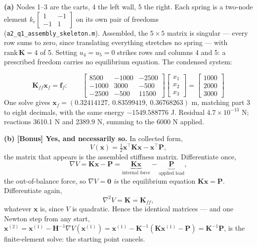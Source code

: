 \documentclass[11pt,a4paper]{article}
\begin{document}
\begin{sloppypar}
\textbf{(a)} Nodes 1--3 are the carts, 4 the left wall, 5 the right. Each spring
is a two-node element
$k_e \left[\begin{smallmatrix} 1 & -1 \\ -1 & 1\end{smallmatrix}\right]$ on its
own pair of freedoms (\texttt{a2\_q1\_assembly\_skeleton.m}). Assembled, the
$5 \times 5$ matrix is singular --- every row sums to zero, since translating
everything stretches no spring --- with $\mathrm{rank}\,\bm{K} = 4$ of 5.
Setting $u_4 = u_5 = 0$ strikes rows and columns 4 and 5: a prescribed freedom
carries no equilibrium equation. The condensed system:
\end{sloppypar}
\[
  \bm{K}_{ff}\bm{x}_f = \bm{f}_f :
  \qquad
  \begin{bmatrix} 8500 & -1000 & -2500 \\ -1000 & 3000 & -500 \\
                  -2500 & -500 & 11500 \end{bmatrix}
  \begin{bmatrix} x_1 \\ x_2 \\ x_3 \end{bmatrix}
  =
  \begin{bmatrix} 1000 \\ 2000 \\ 3000 \end{bmatrix}
\]
One solve gives $\bm{x}_f = (0.32414127,\ 0.83599419,\ 0.36768263)$ m, matching
part 3 to eight decimals, with the same energy $-1549.588776$ J. Residual
$4.7\times10^{-13}$ N; reactions 3610.1 N and 2389.9 N, summing to the 6000 N
applied.

\textbf{(b) [Bonus] Yes, and necessarily so.} In collected form,
\[
  V(\bm{x}) = \tfrac12 \bm{x}^\top\bm{K}\bm{x} - \bm{x}^\top\bm{P},
\]
the matrix that appears is the assembled stiffness matrix. Differentiate once,
\[
  \nabla V = \bm{K}\bm{x} - \bm{P} = \underbrace{\bm{K}\bm{x}}_{\text{internal force}}
            - \underbrace{\bm{P}}_{\text{applied load}},
\]
the out-of-balance force, so $\nabla V = \bm{0}$ \emph{is} the equilibrium
equation $\bm{K}\bm{x} = \bm{P}$. Differentiate again,
\[
  \nabla^2 V = \bm{K} = \bm{K}_{ff},
\]
whatever $\bm{x}$ is, since $V$ is quadratic. Hence the identical matrices --- and
one Newton step from any start,
$\bm{x}^{(2)} = \bm{x}^{(1)} - \bm{H}^{-1}\nabla V(\bm{x}^{(1)})
= \bm{x}^{(1)} - \bm{K}^{-1}(\bm{K}\bm{x}^{(1)} - \bm{P}) = \bm{K}^{-1}\bm{P}$,
is the finite-element solve: the starting point cancels.
\end{document}
